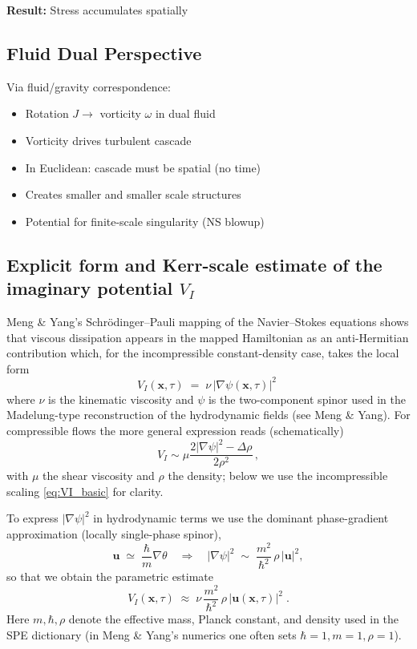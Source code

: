 \documentclass[11pt]{article}
\begin{document}
\textbf{Result:} Stress accumulates spatially

\subsection{Fluid Dual Perspective}

Via fluid/gravity correspondence:
\begin{itemize}
\item Rotation $J \to$ vorticity $\omega$ in dual fluid
\item Vorticity drives turbulent cascade
\item In Euclidean: cascade must be spatial (no time)
\item Creates smaller and smaller scale structures
\item Potential for finite-scale singularity (NS blowup)
\end{itemize}

\subsection*{Explicit form and Kerr-scale estimate of the imaginary potential \(V_I\)}

Meng \& Yang's Schr\"odinger--Pauli mapping of the Navier--Stokes equations shows that viscous dissipation appears in the mapped Hamiltonian as an anti-Hermitian contribution which, for the incompressible constant-density case, takes the local form
\begin{equation}\label{eq:VI_basic}
    \boxed{ \;V_I(\mathbf x,\tau) \;=\; \nu\,\big|\nabla\psi(\mathbf x,\tau)\big|^2 \; \;}
\end{equation}
where \(\nu\) is the kinematic viscosity and \(\psi\) is the two-component spinor used in the Madelung-type reconstruction of the hydrodynamic fields (see Meng \& Yang). For compressible flows the more general expression reads (schematically)
\begin{equation}\label{eq:VI_compressible}
    V_I \sim \mu\frac{2|\nabla\psi|^2 - \Delta\rho}{2\rho^2}\,,
\end{equation}
with \(\mu\) the shear viscosity and \(\rho\) the density; below we use the incompressible scaling \eqref{eq:VI_basic} for clarity.

To express \(|\nabla\psi|^2\) in hydrodynamic terms we use the dominant phase-gradient approximation (locally single-phase spinor),
\[
\mathbf u \;\simeq\; \frac{\hbar}{m}\nabla\theta \quad\Rightarrow\quad
|\nabla\psi|^2 \;\sim\; \frac{m^2}{\hbar^2}\,\rho\,|\mathbf u|^2,
\]
so that we obtain the parametric estimate
\begin{equation}\label{eq:VI_scaling}
    \boxed{ \;V_I(\mathbf x,\tau) \;\approx\; \nu\,\frac{m^2}{\hbar^2}\,\rho\,|\mathbf u(\mathbf x,\tau)|^2 \; .\; }
\end{equation}
Here \(m,\hbar,\rho\) denote the effective mass, Planck constant, and density used in the SPE dictionary (in Meng \& Yang's numerics one often sets \(\hbar=1,m=1,\rho=1\)).
\end{document}
